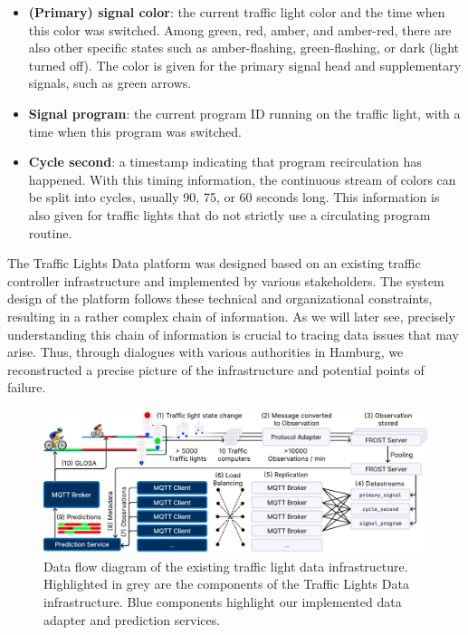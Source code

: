 \begin{itemize}
    \item \textbf{(Primary) signal color}: the current traffic light color and the time when this color was switched. Among green, red, amber, and amber-red, there are also other specific states such as amber-flashing, green-flashing, or dark (light turned off). The color is given for the primary signal head and supplementary signals, such as green arrows.
    \item \textbf{Signal program}: the current program ID running on the traffic light, with a time when this program was switched.
    \item \textbf{Cycle second}: a timestamp indicating that program recirculation has happened. With this timing information, the continuous stream of colors can be split into cycles, usually 90, 75, or 60 seconds long. This information is also given for traffic lights that do not strictly use a circulating program routine.
\end{itemize}

The Traffic Lights Data platform was designed based on an existing traffic controller infrastructure and implemented by various stakeholders. The system design of the platform follows these technical and organizational constraints, resulting in a rather complex chain of information. As we will later see, precisely understanding this chain of information is crucial to tracing data issues that may arise. Thus, through dialogues with various authorities in Hamburg, we reconstructed a precise picture of the infrastructure and potential points of failure.

\begin{figure}[t]
\centering
\includegraphics[width=\linewidth]{images/traffic-light-data-infrastructure.pdf}
\caption{Data flow diagram of the existing traffic light data infrastructure. Highlighted in grey are the components of the Traffic Lights Data infrastructure. Blue components highlight our implemented data adapter and prediction services.}
\label{fig:traffic-light-data-infrastructure}
\end{figure}

